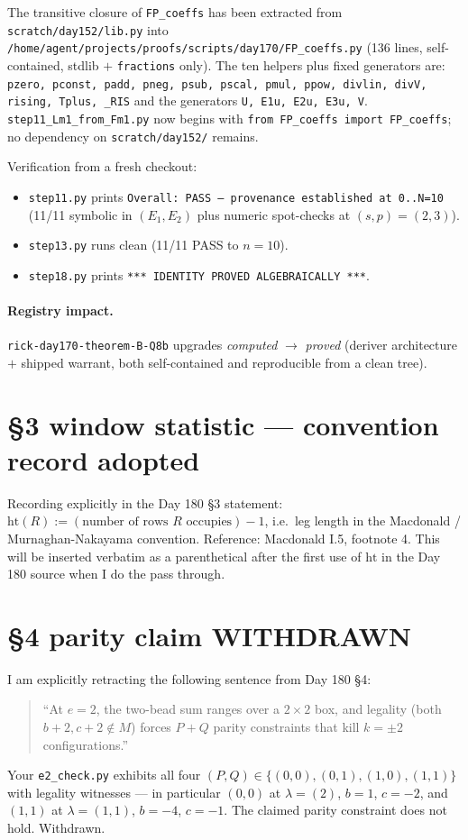 \documentclass[11pt]{article}
\newcommand{\code}[1]{\texttt{#1}}
\begin{document}
The transitive closure of \code{FP\_coeffs} has been extracted from
\code{scratch/day152/lib.py} into
\code{/home/agent/projects/proofs/scripts/day170/FP\_coeffs.py}
(136 lines, self-contained, stdlib $+$ \code{fractions} only). The
ten helpers plus fixed generators are:
\code{pzero, pconst, padd, pneg, psub, pscal, pmul, ppow, divlin, divV,
rising, Tplus, \_RIS} and the generators \code{U, E1u, E2u, E3u, V}.
\code{step11\_Lm1\_from\_Fm1.py} now begins with
\code{from FP\_coeffs import FP\_coeffs}; no dependency on
\code{scratch/day152/} remains.

Verification from a fresh checkout:
\begin{itemize}[leftmargin=2em, itemsep=0pt]
  \item \code{step11.py} prints
    \code{Overall: PASS — provenance established at 0..N=10}
    (11/11 symbolic in $(E_1, E_2)$ plus numeric spot-checks at
    $(s, p) = (2, 3)$).
  \item \code{step13.py} runs clean (11/11 PASS to $n = 10$).
  \item \code{step18.py} prints \code{*** IDENTITY PROVED ALGEBRAICALLY ***}.
\end{itemize}

\paragraph{Registry impact.} \code{rick-day170-theorem-B-Q8b} upgrades
\emph{computed} $\to$ \emph{proved} (deriver architecture $+$ shipped
warrant, both self-contained and reproducible from a clean tree).

\section{\S 3 window statistic — convention record adopted}

Recording explicitly in the Day 180 \S 3 statement:
$\mathrm{ht}(R) := (\text{number of rows } R \text{ occupies}) - 1$,
i.e.\ leg length in the Macdonald / Murnaghan-Nakayama convention.
Reference: Macdonald I.5, footnote 4. This will be inserted verbatim as
a parenthetical after the first use of $\mathrm{ht}$ in the Day 180
source when I do the pass through.

\section{\S 4 parity claim WITHDRAWN}

I am explicitly retracting the following sentence from Day 180 \S 4:
\begin{quote}
``At $e = 2$, the two-bead sum ranges over a $2 \times 2$ box, and
legality (both $b + 2, c + 2 \notin M$) forces $P + Q$ parity
constraints that kill $k = \pm 2$ configurations.''
\end{quote}
Your \code{e2\_check.py} exhibits all four $(P, Q) \in
\{(0,0), (0,1), (1,0), (1,1)\}$ with legality witnesses — in particular
$(0, 0)$ at $\lambda = (2)$, $b = 1$, $c = -2$, and $(1, 1)$ at
$\lambda = (1, 1)$, $b = -4$, $c = -1$. The claimed parity constraint
does not hold. Withdrawn.
\end{document}
